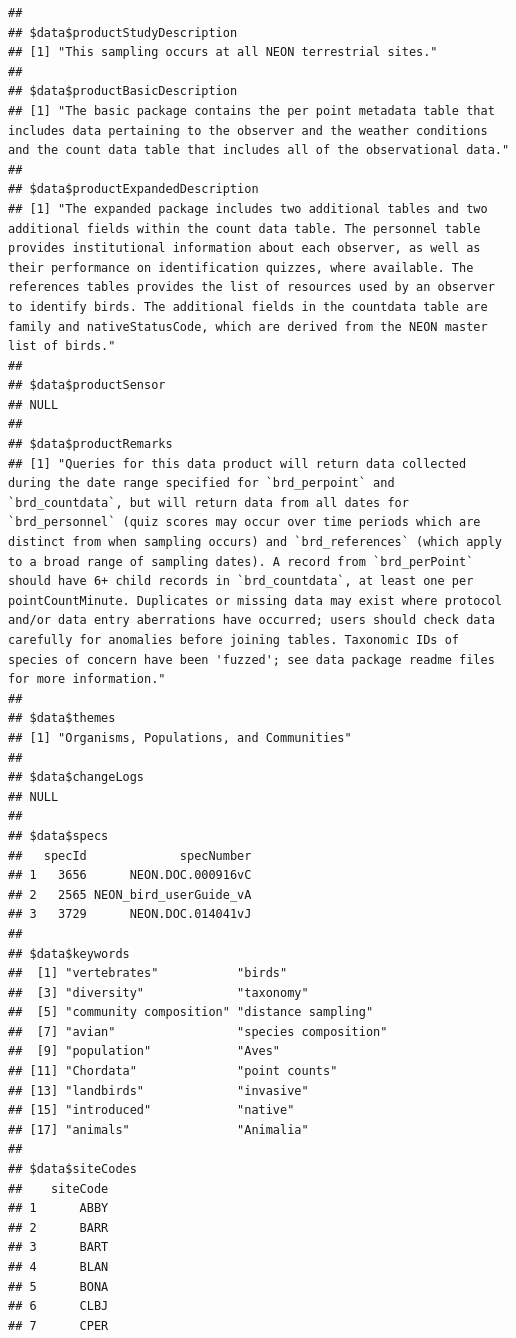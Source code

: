 \documentclass[]{book}
\begin{document}
\begin{verbatim}
## 
## $data$productStudyDescription
## [1] "This sampling occurs at all NEON terrestrial sites."
## 
## $data$productBasicDescription
## [1] "The basic package contains the per point metadata table that includes data pertaining to the observer and the weather conditions and the count data table that includes all of the observational data."
## 
## $data$productExpandedDescription
## [1] "The expanded package includes two additional tables and two additional fields within the count data table. The personnel table provides institutional information about each observer, as well as their performance on identification quizzes, where available. The references tables provides the list of resources used by an observer to identify birds. The additional fields in the countdata table are family and nativeStatusCode, which are derived from the NEON master list of birds."
## 
## $data$productSensor
## NULL
## 
## $data$productRemarks
## [1] "Queries for this data product will return data collected during the date range specified for `brd_perpoint` and `brd_countdata`, but will return data from all dates for `brd_personnel` (quiz scores may occur over time periods which are distinct from when sampling occurs) and `brd_references` (which apply to a broad range of sampling dates). A record from `brd_perPoint` should have 6+ child records in `brd_countdata`, at least one per pointCountMinute. Duplicates or missing data may exist where protocol and/or data entry aberrations have occurred; users should check data carefully for anomalies before joining tables. Taxonomic IDs of species of concern have been 'fuzzed'; see data package readme files for more information."
## 
## $data$themes
## [1] "Organisms, Populations, and Communities"
## 
## $data$changeLogs
## NULL
## 
## $data$specs
##   specId             specNumber
## 1   3656      NEON.DOC.000916vC
## 2   2565 NEON_bird_userGuide_vA
## 3   3729      NEON.DOC.014041vJ
## 
## $data$keywords
##  [1] "vertebrates"           "birds"                
##  [3] "diversity"             "taxonomy"             
##  [5] "community composition" "distance sampling"    
##  [7] "avian"                 "species composition"  
##  [9] "population"            "Aves"                 
## [11] "Chordata"              "point counts"         
## [13] "landbirds"             "invasive"             
## [15] "introduced"            "native"               
## [17] "animals"               "Animalia"             
## 
## $data$siteCodes
##    siteCode
## 1      ABBY
## 2      BARR
## 3      BART
## 4      BLAN
## 5      BONA
## 6      CLBJ
## 7      CPER

\end{verbatim}
\end{document}

